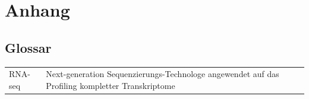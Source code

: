 \documentclass[a4paper]{thesis}
\begin{document}
\section{Anhang}

\subsection{Glossar}

\begin{tabularx}{\textwidth}{lX}
	  RNA-seq
	& Next-generation Sequenzierungs-Technologe angewendet auf
          das Profiling kompletter Transkriptome
\\
\end{tabularx}

{
	\renewcommand\listfigurename{Abbildungsverzeichnis}
	\tocsection{}\listoffigures
}

\nocite{*}
\ifxetex
	\printbibliography[
		title=Quellenverzeichnis,
		heading=subbibnumbered,
	]
\else
	
	
\fi
\end{document}
